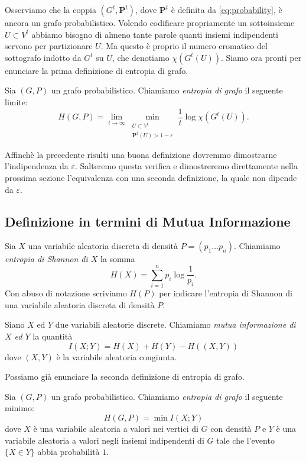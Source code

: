 Osserviamo che la coppia \((G^t, \mathbf{P}^t)\), dove \(\mathbf{P}^t\) è definita da \eqref{eq:probability}, è ancora un grafo probabilistico. Volendo codificare propriamente un sottoinsieme \(U\subset V^{t}\) abbiamo bisogno di almeno tante parole quanti insiemi indipendenti servono per partizionare \(U\). Ma questo è proprio il numero cromatico del sottografo indotto da \(G^t\) su \(U\), che denotiamo \(\chi(G^t(U))\). Siamo ora pronti per enunciare la prima definizione di entropia di grafo. 
\begin{definition}
	Sia \((G,P)\) un grafo probabilistico. Chiamiamo \emph{entropia di grafo} il seguente limite: 
	\begin{equation}
		\label{eq:entropyone} H(G,P)=\lim_{t\to \infty} \min_{\substack{ U\subset V^t\\\mathbf{P}^t(U)>1-\varepsilon}} \frac{1}{t}\log{\chi(G^t(U))}. 
	\end{equation}
\end{definition}

Affinchè la precedente risulti una buona definizione dovremmo dimostrarne l'indipendenza da \(\varepsilon\). Salteremo questa verifica e dimostreremo direttamente nella prossima sezione l'equivalenza con una seconda definizione, la quale non dipende da \(\varepsilon\).

\subsection{Definizione in termini di Mutua Informazione} 
\begin{definition}
	Sia \(X\) una variabile aleatoria discreta di densità \(P=(p_1\dots p_n)\). Chiamiamo \emph{entropia di Shannon di \(X\)} la somma
	\[H(X)=\sum_{i=1}^n p_i \log{\frac{1}{p_i}}.\]
	Con abuso di notazione scriviamo \(H(P)\) per indicare l'entropia di Shannon di una variabile aleatoria discreta di densit\`a \(P\). 
\end{definition}
\begin{definition}
	Siano \(X\) ed \(Y\) due variabili aleatorie discrete. Chiamiamo \emph{mutua informazione di \(X\) ed \(Y\)} la quantità
	\[I(X;Y)=H(X)+H(Y)-H((X,Y))\]
	dove \((X,Y)\) è la variabile aleatoria congiunta. 
\end{definition}

Possiamo già enunciare la seconda definizione di entropia di grafo. 
\begin{definition}
	Sia \((G,P)\) un grafo probabilistico. Chiamiamo \emph{entropia di grafo} il seguente minimo: 
	\begin{equation}
		\label{eq:entropytwo} H(G,P)=\min I(X;Y) 
	\end{equation}
	dove \(X\) è una variabile aleatoria a valori nei vertici di \(G\) con densità \(P\) e \(Y\) è una variabile aleatoria a valori negli insiemi indipendenti di \(G\) tale che l'evento \(\{X\in Y\}\) abbia probabilità \(1\). 
\end{definition}

